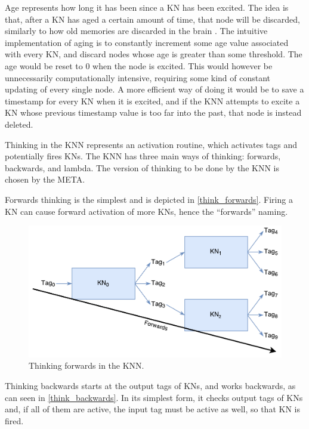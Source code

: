 \documentclass[titlepage,11pt]{article}
\begin{document}
Age represents how long it has been since a KN has been excited. The idea is that, after a KN has aged a certain amount of time, that node will be discarded, similarly to how old memories are discarded in the brain \cite{aging}. The intuitive implementation of aging is to constantly increment some age value associated with every KN, and discard nodes whose age is greater than some threshold. The age would be reset to 0 when the node is excited. This would however be unnecessarily computationally intensive, requiring some kind of constant updating of every single node. A more efficient way of doing it would be to save a timestamp for every KN when it is excited, and if the KNN attempts to excite a KN whose previous timestamp value is too far into the past, that node is instead deleted.

Thinking in the KNN represents an activation routine, which activates tags and potentially fires KNs. The KNN has three main ways of thinking: forwards, backwards, and lambda. The version of thinking to be done by the KNN is chosen by the META.

Forwards thinking is the simplest and is depicted in \autoref{think_forwards}. Firing a KN can cause forward activation of more KNs, hence the ``forwards'' naming.

\begin{figure}[!htb]
	\includegraphics[width=\columnwidth]{figures/forwards_thinking.pdf}
	\caption{Thinking forwards in the KNN.}
	\label{think_forwards}
\end{figure}

Thinking backwards starts at the output tags of KNs, and works backwards, as can seen in \autoref{think_backwards}. In its simplest form, it checks output tags of KNs and, if all of them are active, the input tag must be active as well, so that KN is fired.
\end{document}
